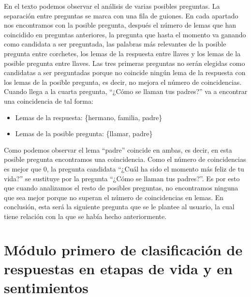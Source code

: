 En el texto podemos observar el análisis de varias posibles preguntas. La separación entre preguntas se marca con una fila de guiones. En cada apartado nos encontramos con la posible pregunta, después el número de lemas que han coincidido en preguntas anteriores, la pregunta que hasta el momento va ganando como candidata a ser preguntada, las palabras más relevantes de la posible pregunta entre corchetes, los lemas de la respuesta entre llaves y los lemas de la posible pregunta entre llaves. Las tres primeras preguntas no serán elegidas como candidatas a ser preguntadas porque no coincide ningún lema de la respuesta con los lemas de la posible pregunta, es decir, no mejora el número de coincidencias. Cuando llega a la cuarta pregunta, ``¿Cómo se llaman tus padres?'' va a encontrar una coincidencia de tal forma:

\begin{itemize}
	\item[] Lemas de la respuesta: \hspace{2cm} \{hermano, familia, padre\} 
	\item[] Lemas de la posible pregunta: \hspace{0.8cm} \{llamar, padre\}
\end{itemize}

Como podemos observar el lema ``padre'' coincide en ambas, es decir, en esta posible pregunta encontramos una coincidencia. Como el número de coincidencias es mejor que 0, la pregunta candidata ``¿Cuál ha sido el momento más feliz de tu vida?'' se sustituye por la pregunta ``¿Cómo se llaman tus padres?''. Es por esto que cuando analizamos el resto de posibles preguntas, no encontramos ninguna que sea mejor porque no superan el número de coincidencias en lemas. En conclusión, esta será la siguiente pregunta que se le plantee al usuario, la cual tiene relación con la que se había hecho anteriormente. 

\section{Módulo primero de clasificación de respuestas en etapas de vida y en sentimientos}

